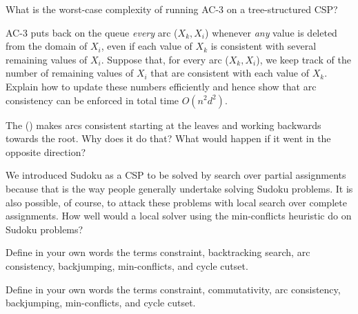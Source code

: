 \begin{exercise}
What is the worst-case complexity of running AC-3 on a tree-structured CSP?
\end{exercise} 

\begin{exercise}[ac4-exercise]
AC-3 puts back on the queue {\em every} arc (\(X_{k}, X_{i}\))
whenever {\em any} value is deleted from the domain of \(X_{i}\), even if each value of
\(X_{k}\) is consistent with several remaining values of \(X_{i}\). Suppose that, for every arc
(\(X_{k}, X_{i}\)), we keep track of the number of remaining values of
\(X_{i}\) that are consistent with each value of \(X_{k}\).  Explain how
to update these numbers efficiently and hence show that arc
consistency can be enforced in total time \(O(n^2d^2)\).
\end{exercise} 



\begin{exercise}
The  () makes arcs consistent starting at the leaves and working backwards 
towards the root.  Why does it do that?  What would happen if it went in the opposite direction?
\end{exercise} 

\begin{exercise}
We introduced Sudoku as a CSP to be solved by search over partial assignments because
that is the way people generally undertake solving Sudoku problems.  It is also possible,
of course, to attack these problems with local search over complete assignments. How well
would a local solver using the min-conflicts heuristic do on Sudoku problems?
\end{exercise} 



\begin{uexercise}%
Define in your own words the terms constraint, backtracking search, arc consistency,
backjumping, min-conflicts, and cycle cutset.
\end{uexercise} 

\begin{iexercise}%
Define in your own words the terms constraint, commutativity, arc consistency,
backjumping, min-conflicts, and cycle cutset.
\end{iexercise} 

